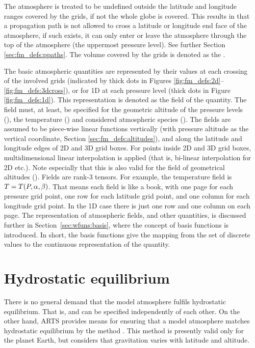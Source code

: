 The atmosphere is treated to be undefined outside the latitude and longitude
ranges covered by the grids, if not the whole globe is covered. This results in
that a propagation path is not allowed to cross a latitude or longitude end
face of the atmosphere, if such exists, it can only enter or leave the
atmosphere through the top of the atmosphere (the uppermost pressure level).
See further Section \ref{sec:fm_defs:ppaths}. The volume covered by the grids
is denoted as the .

The basic atmospheric quantities are represented by their values at each
crossing of the involved grids (indicated by thick dots in Figures
\ref{fig:fm_defs:2d}--\ref{fig:fm_defs:3dcross}), or for 1D at each pressure
level (thick dots in Figure \ref{fig:fm_defs:1d}). This representation is
denoted as the field of the quantity. The field must,
at least, be specified for the geometric altitude of the pressure levels
(), the temperature () and considered
atmospheric species (). The fields are assumed to be
piece-wise linear functions vertically (with pressure altitude as the vertical
coordinate, Section \ref{sec:fm_defs:altitudes}), and along the latitude and
longitude edges of 2D and 3D grid boxes. For points inside 2D and 3D grid
boxes, multidimensional linear interpolation is applied (that is, bi-linear
interpolation for 2D etc.). Note especially that this is also valid for the
field of geometrical altitudes (). Fields are rank-3
tensors. For example, the temperature field is $T=T(P,\alpha,\beta)$. That
means each field is like a book, with one page for each pressure grid point,
one row for each latitude grid point, and one column for each longitude grid
point. In the 1D case there is just one row and one column on each page. The
representation of atmospheric fields, and other quantities, is discussed
further in Section~\ref{sec:wfuns:basis}, where the concept of basis
functions is introduced. In short, the basis functions
give the mapping from the set of discrete values to the continuous
representation of the quantity.



\section{Hydrostatic equilibrium}
\label{sec:fm_defs:hse}

There is no general demand that the model atmosphere fulfils hydrostatic
equilibrium. That is,  and  can be
specified independently of each other. On the other hand, ARTS provides means
for ensuring that a model atmosphere matches hydrostatic equilibrium by the
method . This method is presently valid only for the
planet Earth, but considers that gravitation varies with latitude and altitude.

